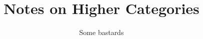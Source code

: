 \documentclass[nohyper,nobib,nofonts]{stern-book}
\title{Notes on Higher Categories}
\author{Some bastards}
\begin{document}
	\maketitlepage
	\setcounter{tocdepth}{1}
	\tableofcontents
	
	
	
	
	
	
	
	
	
	\begin{appendices}
	  
	\end{appendices}
	
\end{document}
